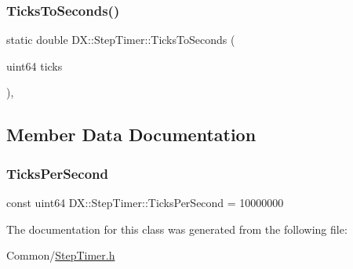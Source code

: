 \mbox{\label{class_d_x_1_1_step_timer_a59a20b9b3294d930299991c62703b0d0}} 
\subsubsection{\texorpdfstring{Ticks\+To\+Seconds()}{TicksToSeconds()}}
{\footnotesize\ttfamily static double D\+X\+::\+Step\+Timer\+::\+Ticks\+To\+Seconds (\begin{DoxyParamCaption}\item[{uint64}]{ticks }\end{DoxyParamCaption})\hspace{0.3cm}{\ttfamily [inline]}, {\ttfamily [static]}}



\subsection{Member Data Documentation}
\mbox{\label{class_d_x_1_1_step_timer_aa671440c6c8008bd407ae889f5fb9f87}} 
\subsubsection{\texorpdfstring{Ticks\+Per\+Second}{TicksPerSecond}}
{\footnotesize\ttfamily const uint64 D\+X\+::\+Step\+Timer\+::\+Ticks\+Per\+Second = 10000000\hspace{0.3cm}{\ttfamily [static]}}



The documentation for this class was generated from the following file\+:\begin{DoxyCompactItemize}
\item 
Common/\hyperlink{_step_timer_8h}{Step\+Timer.\+h}\end{DoxyCompactItemize}

